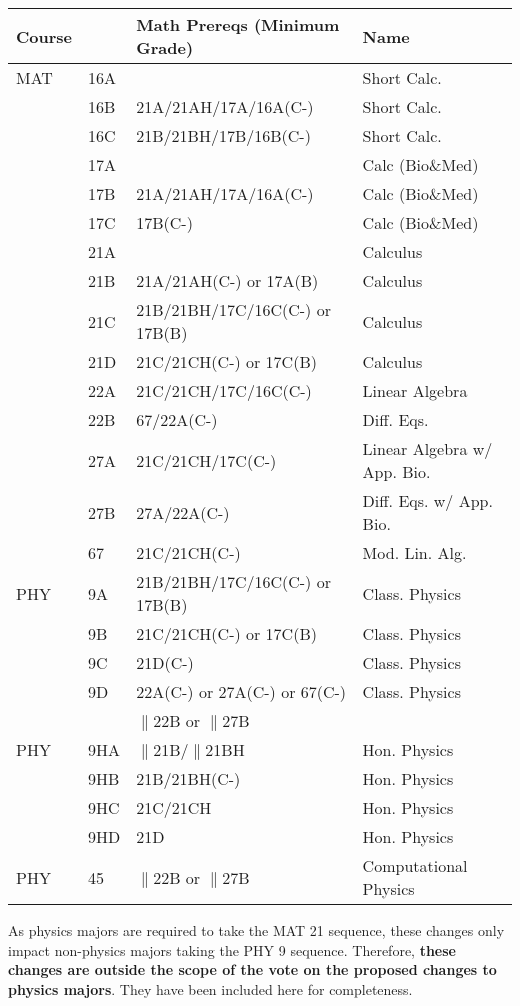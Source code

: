 \documentclass[12pt]{article}
\begin{document}
\begin{center}
\begin{tabular}{|llll|}
\hline
Course & & Math Prereqs (Minimum Grade)& Name \\
\hline
MAT & 16A & & Short Calc.\\
    & 16B & 21A/21AH/17A/16A(C-) & Short Calc.\\
    & 16C & 21B/21BH/17B/16B(C-) & Short Calc.\\
    & 17A &                      & Calc (Bio\&Med)\\
    & 17B & 21A/21AH/17A/16A(C-) & Calc (Bio\&Med)\\
    & 17C & 17B(C-)              & Calc (Bio\&Med)\\
    & 21A &                      & Calculus \\
    & 21B & 21A/21AH(C-) or 17A(B) & Calculus \\
    & 21C & 21B/21BH/17C/16C(C-) or 17B(B) & Calculus\\
    & 21D & 21C/21CH(C-) or 17C(B)  & Calculus \\
    & 22A & 21C/21CH/17C/16C(C-)    & Linear Algebra \\
    & 22B & 67/22A(C-)              & Diff. Eqs. \\
    & 27A & 21C/21CH/17C(C-)        & Linear Algebra w/ App. Bio. \\
    & 27B & 27A/22A(C-)             & Diff. Eqs. w/ App. Bio.\\
    & 67  & 21C/21CH(C-)            & Mod. Lin. Alg. \\
\hline
\hline
PHY & 9A & 21B/21BH/17C/16C(C-) or 17B(B) & Class. Physics\\
    & 9B & 21C/21CH(C-) or 17C(B) & Class. Physics\\
    & 9C & 21D(C-) & Class. Physics\\
    & 9D & 22A(C-) or 27A(C-) or 67(C-) & Class. Physics\\
    &    & $\parallel$22B or $\parallel$27B & \\
\hline
\hline
PHY & 9HA & $\parallel$21B/$\parallel$21BH & Hon. Physics\\
    & 9HB    & 21B/21BH(C-) & Hon. Physics \\
    & 9HC    & 21C/21CH & Hon. Physics \\
    & 9HD    & 21D  & Hon. Physics \\
\hline
PHY & 45     & $\parallel$22B or $\parallel$27B & Computational Physics \\
\hline
\end{tabular}
\end{center}
As physics majors are required to take the MAT 21 sequence, these
changes only impact non-physics majors taking the PHY 9 sequence.
Therefore, {\bf these changes are outside the scope of the vote on the
  proposed changes to physics majors}.  They have been included here
for completeness.
\end{document}
